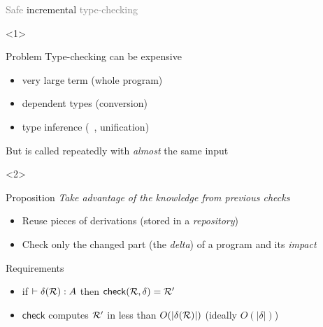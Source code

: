 \documentclass{beamer}
\theoremstyle{example}
\begin{document}
\begin{frame}{\textcolor{gray}{Safe} incremental
    \textcolor{gray}{type-checking}}


  \begin{onlyenv}<1>
    \begin{block}{Problem}
      Type-checking can be expensive
      \begin{example}
        \begin{itemize}
        \item very large term (whole program)
        \item dependent types (conversion)
        \item type inference (\eg\ , unification)
        \end{itemize}
      \end{example}
      But is called repeatedly with \emph{almost} the same input
    \end{block}
  \end{onlyenv}

  \begin{onlyenv}<2>
    \begin{block}{Proposition}
      \emph{Take advantage of the knowledge from previous checks}
      \begin{itemize}
      \item Reuse pieces of derivations (stored in a \emph{repository})
      \item Check only the changed part (the \emph{delta}) of a
        program and its \emph{impact}
      \end{itemize}

        \centering
    \end{block}

    \begin{block}{Requirements}
      \begin{itemize}
      \item if $\vdash \delta(\mathcal{R}) : A$ then ${\rm\mathsf{check}}({\mathcal{R},
          \delta}) = \mathcal{R'}$
      \item $\mathsf{check}$ computes $\mathcal{R'}$ in less than $O(|\delta(\mathcal{R})|)$ \small\qquad (ideally
        $O(|\delta|)$)
      \end{itemize}
    \end{block}
  \end{onlyenv}

\end{frame}
\end{document}
